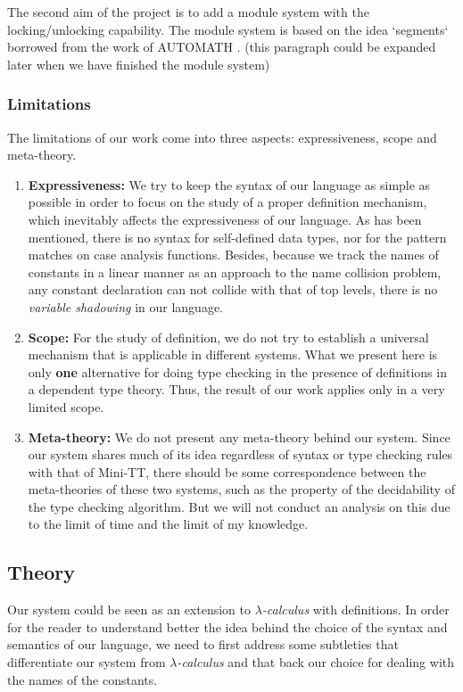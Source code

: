 \documentclass{article}
\theoremstyle{remark}
\begin{document}
The second aim of the project is to add a module system with the locking/unlocking capability. The module system is based on the idea `segments` borrowed from the work of AUTOMATH \cite{de1994survey}. (this paragraph could be expanded later when we have finished the module system)

\subsubsection{Limitations}
The limitations of our work come into three aspects: expressiveness, scope and meta-theory.
\begin{enumerate}
\item \textbf{Expressiveness:} We try to keep the syntax of our language as simple as possible in order to focus on the study of a proper definition mechanism, which inevitably affects the expressiveness of our language. As has been mentioned, there is no syntax for self-defined data types, nor for the pattern matches on case analysis functions. Besides, because we track the names of constants in a linear manner as an approach to the name collision problem, any constant declaration can not collide with that of top levels, there is no \emph{variable shadowing} in our language.
\item \textbf{Scope:} For the study of definition, we do not try to establish a universal mechanism that is applicable in different systems. What we present here is only \textbf{one} alternative for doing type checking in the presence of definitions in a dependent type theory. Thus, the result of our work applies only in a very limited scope.
\item \textbf{Meta-theory:} We do not present any meta-theory behind our system. Since our system shares much of its idea regardless of syntax or type checking rules with that of Mini-TT, there should be some correspondence between the meta-theories of these two systems, such as the property of the decidability of the type checking algorithm. But we will not conduct an analysis on this due to the limit of time and the limit of my knowledge. 
\end{enumerate}

\subsection{Theory}
Our system could be seen as an extension to \emph{$\lambda$-calculus} with definitions. In order for the reader to understand better the idea behind the choice of the syntax and semantics of our language, we need to first address some subtleties that differentiate our system from \emph{$\lambda$-calculus} and that back our choice for dealing with the names of the constants.
\end{document}
